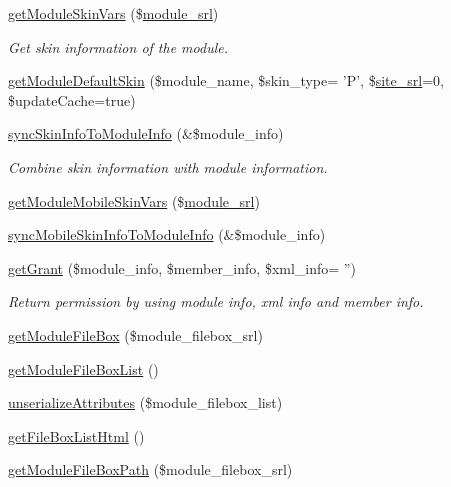 \begin{DoxyCompactItemize}
\hyperlink{classmoduleModel_aa3828c94af2b1c8b84fafd423038445d}{get\+Module\+Skin\+Vars} (\$\hyperlink{ko_8install_8php_a370bb6450fab1da3e0ed9f484a38b761}{module\+\_\+srl})
\begin{DoxyCompactList}\small\item\em Get skin information of the module. \end{DoxyCompactList}\item 
\hyperlink{classmoduleModel_a0a77bcbc85aa39eebe18687ab6e0b974}{get\+Module\+Default\+Skin} (\$module\+\_\+name, \$skin\+\_\+type= 'P', \$\hyperlink{ko_8install_8php_a8b1406b4ad1048041558dce6bfe89004}{site\+\_\+srl}=0, \$update\+Cache=true)
\item 
\hyperlink{classmoduleModel_af9179765de4796b45236b62be16eb8fb}{sync\+Skin\+Info\+To\+Module\+Info} (\&\$module\+\_\+info)
\begin{DoxyCompactList}\small\item\em Combine skin information with module information. \end{DoxyCompactList}\item 
\hyperlink{classmoduleModel_aef7f4760b4c1864752d1042e1a0667c8}{get\+Module\+Mobile\+Skin\+Vars} (\$\hyperlink{ko_8install_8php_a370bb6450fab1da3e0ed9f484a38b761}{module\+\_\+srl})
\item 
\hyperlink{classmoduleModel_ae90cd832480cf8c46e96d95c20a63387}{sync\+Mobile\+Skin\+Info\+To\+Module\+Info} (\&\$module\+\_\+info)
\item 
\hyperlink{classmoduleModel_a0d6431efeb3e3d377dbbb20b414ba074}{get\+Grant} (\$module\+\_\+info, \$member\+\_\+info, \$xml\+\_\+info= '')
\begin{DoxyCompactList}\small\item\em Return permission by using module info, xml info and member info. \end{DoxyCompactList}\item 
\hyperlink{classmoduleModel_a792e14b71d66044513a646a44216be17}{get\+Module\+File\+Box} (\$module\+\_\+filebox\+\_\+srl)
\item 
\hyperlink{classmoduleModel_a8f3a098b40649594a591e5ea8bd15d96}{get\+Module\+File\+Box\+List} ()
\item 
\hyperlink{classmoduleModel_a60ec88f0d61e7a44887bebba8048a18d}{unserialize\+Attributes} (\$module\+\_\+filebox\+\_\+list)
\item 
\hyperlink{classmoduleModel_acf3405bfe791d8bf7d8e7886b9481923}{get\+File\+Box\+List\+Html} ()
\item 
\hyperlink{classmoduleModel_ac1183d568d6dab443a83c8618e6eb348}{get\+Module\+File\+Box\+Path} (\$module\+\_\+filebox\+\_\+srl)

\end{DoxyCompactItemize}
